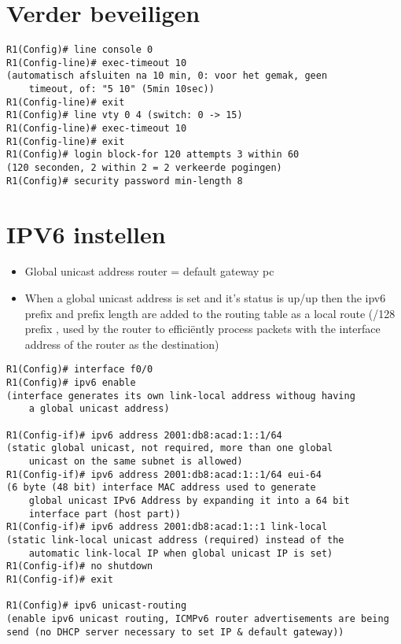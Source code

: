 \documentclass[10pt, a4paper]{article}
\begin{document}
\section{Verder beveiligen}
\begin{lstlisting}
R1(Config)# line console 0
R1(Config-line)# exec-timeout 10
(automatisch afsluiten na 10 min, 0: voor het gemak, geen
	timeout, of: "5 10" (5min 10sec))
R1(Config-line)# exit
R1(Config)# line vty 0 4 (switch: 0 -> 15)
R1(Config-line)# exec-timeout 10
R1(Config-line)# exit
R1(Config)# login block-for 120 attempts 3 within 60
(120 seconden, 2 within 2 = 2 verkeerde pogingen)
R1(Config)# security password min-length 8
\end{lstlisting}

\section{IPV6 instellen}
\begin{itemize}[noitemsep,nolistsep]
\item Global unicast address router = default gateway pc
\item When a global unicast address is set and it's status is up/up then the ipv6 prefix and prefix length are added to the routing table as a local route (/128 prefix , used by the router to effici\"ently process packets with the
interface address of the router as the destination)\\
\end{itemize}
\begin{lstlisting}
R1(Config)# interface f0/0
R1(Config)# ipv6 enable
(interface generates its own link-local address withoug having
	a global unicast address)

R1(Config-if)# ipv6 address 2001:db8:acad:1::1/64
(static global unicast, not required, more than one global
	unicast on the same subnet is allowed)
R1(Config-if)# ipv6 address 2001:db8:acad:1::1/64 eui-64
(6 byte (48 bit) interface MAC address used to generate
	global unicast IPv6 Address by expanding it into a 64 bit
	interface part (host part))
R1(Config-if)# ipv6 address 2001:db8:acad:1::1 link-local
(static link-local unicast address (required) instead of the
	automatic link-local IP when global unicast IP is set)
R1(Config-if)# no shutdown
R1(Config-if)# exit

R1(Config)# ipv6 unicast-routing
(enable ipv6 unicast routing, ICMPv6 router advertisements are being
send (no DHCP server necessary to set IP & default gateway))
\end{lstlisting}
\end{document}
